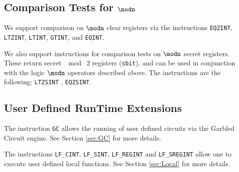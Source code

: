 \subsection{Comparison Tests for $\modn$}
We support comparison on $\modn$ clear registers via the instructions
\verb+EQZINT+, \verb+LTZINT+, \verb+LTINT+, \verb+GTINT+, and \verb+EQINT+.

We also support instructions for comparison tests on $\modn$ secret registers. These return 
secret $\mod \; 2$ registers (\verb+sbit+), and can be used in conjunction with the logic $\modn$ operators described above. The instructions are the following: 
\verb+LTZSINT+ ,
\verb+EQZSINT+.

\subsection{User Defined RunTime Extensions}
The instruction \verb+GC+ allows the running of user defined
circuits via the Garbled Circuit engine.
See Section \ref{sec:GC} for more details.

The instructions \verb|LF_CINT|, \verb|LF_SINT|, \verb|LF_REGINT| 
and \verb|LF_SREGINT| allow one to execute user defined
local functions.
See Section \ref{sec:Local} for more details.

